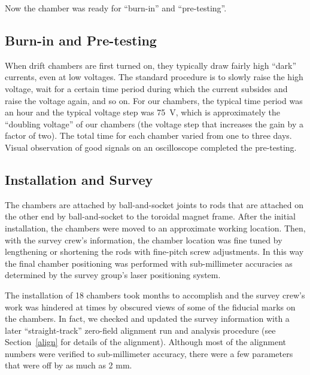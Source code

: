 Now the chamber was ready for ``burn-in'' and ``pre-testing''.

\subsection{Burn-in and Pre-testing}

When drift chambers are first turned on, they typically draw fairly high
``dark'' currents, even at low voltages.  The standard procedure is to
slowly raise the high voltage, wait for a certain time period during
which the current subsides and raise the voltage again, and so on.
For our chambers, the typical time period was an hour and the typical
voltage step was 75~V, which is approximately the ``doubling voltage'' of
our chambers (the voltage step that increases the gain by a factor
of two).  The total time for each chamber varied from one to three days.
Visual observation of good signals on an oscilloscope completed
the pre-testing.

\subsection{Installation and Survey}

The chambers are attached by ball-and-socket joints to rods that are attached
on the other end by ball-and-socket to the toroidal magnet frame.
After the initial installation, the chambers were moved to an approximate
working location.  Then, with the survey crew's information, the chamber location
was fine tuned by lengthening or shortening the rods with fine-pitch screw adjustments.
In this way the final chamber positioning was performed with sub-millimeter accuracies as
determined by the survey group's laser positioning system.

The installation of 18 chambers took months to accomplish and the survey crew's work
was hindered at times by obscured views of some of the fiducial marks on the 
chambers.  In fact, we checked and updated the survey information with a later 
``straight-track'' zero-field alignment run and analysis procedure (see Section~\ref{align}
for details of the alignment).
Although most of the alignment numbers were verified to sub-millimeter accuracy, there
were a few parameters that were off by as much as 2 mm.


